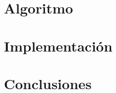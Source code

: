 \documentclass{report}
\begin{document}
	\section{Algoritmo}
	
	\section{Implementaci\'on}
	
	\section{Conclusiones}
	
\end{document}
